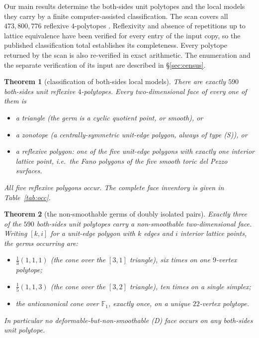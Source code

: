 \documentclass[11pt]{amsart}
\newtheorem{theorem}{Theorem}[section]
\theoremstyle{definition}
\theoremstyle{remark}
\newcommand{\FF}{\mathbb{F}}
\begin{document}
Our main results determine the both-sides unit polytopes and the local
models they carry by a finite computer-assisted classification.  The scan
covers all $473{,}800{,}776$ reflexive $4$-polytopes
\cite{KreuzerSkarke00}.  Reflexivity and absence of repetitions up to
lattice equivalence have been verified for every entry of the input
copy, so the published classification total establishes its completeness.
Every polytope returned by the scan is also re-verified in exact arithmetic.
The enumeration and the separate verification of its input are described
in \S\ref{sec:census}.

\begin{theorem}[classification of both-sides local models]\label{thm:class}
There are exactly $590$ both-sides
unit reflexive $4$-polytopes.  Every
two-dimensional face of every one of them is
\begin{itemize}
\item a triangle (the germ is a cyclic quotient point, or smooth), or
\item a zonotope (a centrally-symmetric unit-edge polygon, always of
type \textup{(S)}), or
\item a reflexive polygon: one of the five unit-edge polygons with exactly
one interior lattice point, i.e.\ the Fano polygons of the five
smooth toric del Pezzo surfaces.
\end{itemize}
All five reflexive polygons occur.  The complete face inventory is given in
Table~\textup{\ref{tab:occ}}.
\end{theorem}

\begin{theorem}[the non-smoothable germs of doubly isolated pairs]
\label{thm:dichot}
Exactly three of the $590$ both-sides unit
polytopes carry a non-smoothable
two-dimensional face.  Writing $[k,i]$ for a unit-edge polygon with $k$
edges and $i$ interior lattice points, the germs occurring are:
\begin{itemize}
\item $\frac13(1,1,1)$ (the cone over the $[3,1]$ triangle), six times on
one $9$-vertex polytope;
\item $\frac15(1,1,3)$ (the cone over the $[3,2]$ triangle), ten times on
a single simplex;
\item the anticanonical cone over $\FF_1$, exactly \emph{once}, on a
unique $22$-vertex polytope.
\end{itemize}
In particular no deformable-but-non-smoothable
\textup{(D)} face occurs on any both-sides unit polytope.
\end{theorem}
\end{document}
